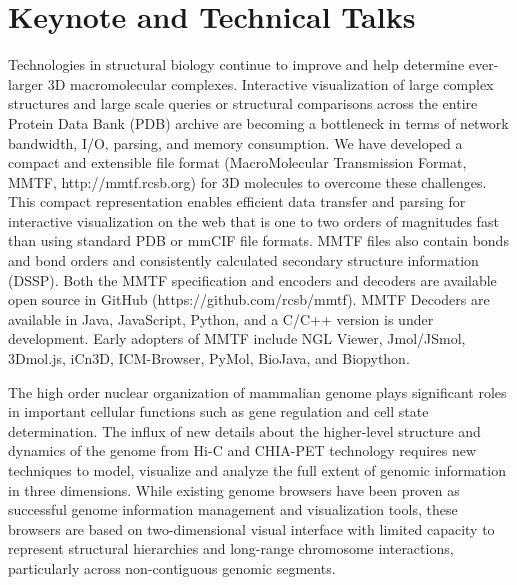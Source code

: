 \documentclass[a4paper]{article}
\begin{document}
\section{Keynote and Technical Talks}

Technologies in structural biology continue to improve and help determine ever-larger 3D macromolecular complexes. Interactive visualization of large complex structures and large scale queries or structural comparisons across the entire Protein Data Bank (PDB) archive are becoming a bottleneck in terms of network bandwidth, I/O, parsing, and memory consumption. We have developed a compact and extensible file format (MacroMolecular Transmission Format, MMTF, http://mmtf.rcsb.org) for 3D molecules to overcome these challenges. This compact representation enables efficient data transfer and parsing for interactive visualization on the web that is one to two orders of magnitudes fast than using standard PDB or mmCIF file formats. MMTF files also contain bonds and bond orders and consistently calculated secondary structure information (DSSP). Both the MMTF specification and encoders and decoders are available open source in GitHub (https://github.com/rcsb/mmtf). MMTF Decoders are available in Java, JavaScript, Python, and a C/C++ version is under development. Early adopters of MMTF include NGL Viewer, Jmol/JSmol, 3Dmol.js, iCn3D, ICM-Browser, PyMol, BioJava, and Biopython.



The high order nuclear organization of mammalian genome plays significant
roles in important cellular functions such as gene regulation and cell
state determination.  The influx of new details about the higher-level
structure and dynamics of the genome from Hi-C and CHIA-PET technology
requires new techniques to model, visualize and analyze the full extent of
genomic information in three dimensions. While existing genome browsers
have been proven as successful genome information management and
visualization tools, these browsers are based on two-dimensional visual
interface with limited capacity to represent structural hierarchies and
long-range chromosome interactions, particularly across non-contiguous
genomic segments. 
\end{document}
